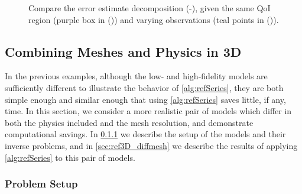 \begin{figure}[htbp]
\centering
{} 
  \caption{Compare the error estimate decomposition (\protect{}-\protect{}), given the same QoI region (purple box in (\protect{})) and varying observations (teal points in (\protect{})).}
  \label{fig:dataStudy}
\end{figure}

\subsection{Combining Meshes and Physics in 3D} \label{sec:diffvcdr3D}

In the previous examples, although the low- and high-fidelity models are sufficiently different to illustrate the behavior of \cref{alg:refSeries}, they are both simple enough and similar enough that using \cref{alg:refSeries} saves little, if any, time. In this section, we consider a more realistic pair of models which differ in both the physics included and the mesh resolution, and demonstrate computational savings. In \cref{sec:setup3D_diffmesh} we describe the setup of the models and their inverse problems, and in \cref{sec:ref3D_diffmesh} we describe the results of applying \cref{alg:refSeries} to this pair of models.

\subsubsection{Problem Setup} \label{sec:setup3D_diffmesh}

